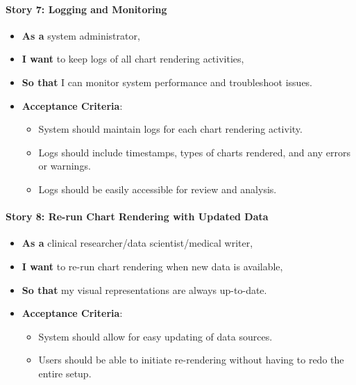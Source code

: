 \paragraph{Story 7: Logging and
Monitoring}\label{story-7-logging-and-monitoring}

\begin{itemize}
\item
  \textbf{As a} system administrator,
\item
  \textbf{I want} to keep logs of all chart rendering activities,
\item
  \textbf{So that} I can monitor system performance and troubleshoot
  issues.
\item
  \textbf{Acceptance Criteria}:

  \begin{itemize}
  \item
    System should maintain logs for each chart rendering activity.
  \item
    Logs should include timestamps, types of charts rendered, and any
    errors or warnings.
  \item
    Logs should be easily accessible for review and analysis.
  \end{itemize}
\end{itemize}

\paragraph{Story 8: Re-run Chart Rendering with Updated
Data}\label{story-8-re-run-chart-rendering-with-updated-data}

\begin{itemize}
\item
  \textbf{As a} clinical researcher/data scientist/medical writer,
\item
  \textbf{I want} to re-run chart rendering when new data is available,
\item
  \textbf{So that} my visual representations are always up-to-date.
\item
  \textbf{Acceptance Criteria}:

  \begin{itemize}
  \item
    System should allow for easy updating of data sources.
  \item
    Users should be able to initiate re-rendering without having to redo
    the entire setup.
  \end{itemize}
\end{itemize}

